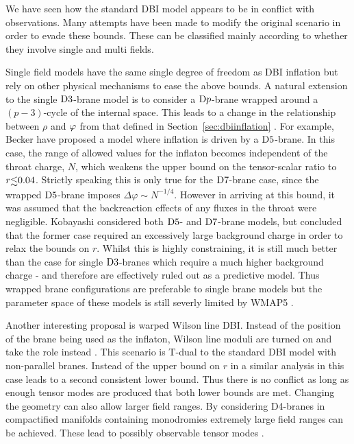 \label{sec:others-dbi}
We have seen how the standard DBI model appears to be in conflict with
observations. Many attempts have been made to modify the original scenario in
order to evade these bounds. These can be classified mainly according to
whether they involve single and multi fields. 

Single field models have the same single degree of freedom as DBI inflation but
rely on other physical mechanisms to ease the above bounds.
A natural extension to the single ${\rm D3}$-brane model 
is to consider a ${\rm D}p$-brane wrapped around a $(p-3)$-cycle of the 
internal space.
This leads to a change in the relationship
between $\rho$ and $\varphi$ from that defined in Section~\ref{sec:dbiinflation}
\cite{Kobayashi:2007hm, Becker:2007ui, Ward:2007gs}.  
For example, Becker \etal \cite{Becker:2007ui} 
have proposed a model where inflation is driven by a ${\rm D5}$-brane. 
In this case, the range of allowed values for the inflaton 
becomes independent of the throat charge, $N$, which weakens the upper bound on 
the tensor-scalar ratio to $r \lsim 0.04$. Strictly speaking this is 
only true for the ${\rm D7}$-brane case, since the
wrapped ${\rm D5}$-brane imposes 
$\Delta \varphi \sim N^{-1/4}$.
However in arriving at this bound, it was assumed that the 
backreaction effects of any fluxes in the throat were 
negligible. 
Kobayashi \etal \cite{Kobayashi:2007hm} 
considered both ${\rm D5}$- and
${\rm D7}$-brane models, but concluded that the former case
required an excessively large background charge in 
order to relax the bounds on $r$. Whilst this is highly constraining, it is
still much better than
the
case for single ${\rm D3}$-branes which require a much higher background charge
- and therefore are
effectively ruled
out as a predictive model. 
Thus wrapped brane configurations are preferable to
single brane models but the parameter space of these models is still severly
limited by WMAP5 \cite{Alabidi:2008ej}. 

Another interesting proposal is warped Wilson line DBI. Instead of the position
of the brane being used as the inflaton, Wilson line moduli are turned on and
take the role instead \cite{Avgoustidis:2008zu}. This scenario is T-dual to the
standard DBI model with non-parallel branes. Instead of the upper bound on $r$
in  a similar analysis in this case leads to a second
consistent lower bound. Thus there is no conflict as long as enough tensor
modes are produced that both lower bounds are met. 
% 
Changing the geometry can also allow larger field ranges. By considering
D4-branes in compactified manifolds containing monodromies extremely large
field ranges can be achieved. These lead to possibly observable tensor modes
\cite{Silverstein:2008sg}.


